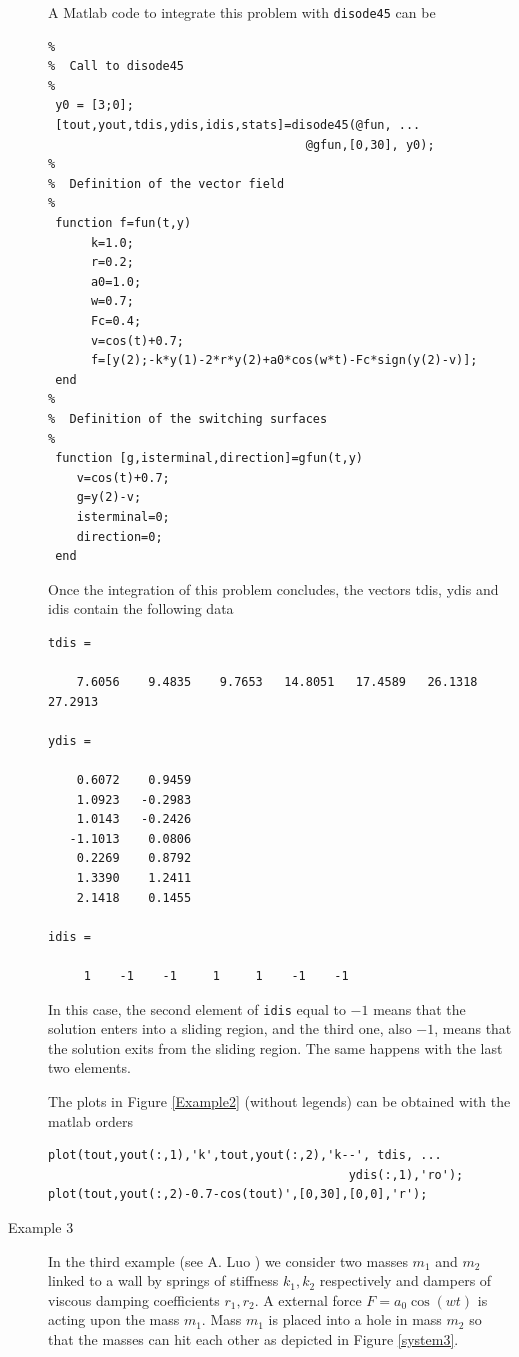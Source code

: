 \documentclass{article}
\begin{document}
\begin{description}
A Matlab code to integrate this problem with \texttt{disode45} can be

\bigskip

\begin{verbatim}
%
%  Call to disode45
%
 y0 = [3;0];
 [tout,yout,tdis,ydis,idis,stats]=disode45(@fun, ...
                                    @gfun,[0,30], y0);
%
%  Definition of the vector field
%
 function f=fun(t,y)
      k=1.0;
      r=0.2;
      a0=1.0;
      w=0.7;
      Fc=0.4;
      v=cos(t)+0.7;
      f=[y(2);-k*y(1)-2*r*y(2)+a0*cos(w*t)-Fc*sign(y(2)-v)];
 end
%
%  Definition of the switching surfaces
%
 function [g,isterminal,direction]=gfun(t,y)
    v=cos(t)+0.7;
    g=y(2)-v;
    isterminal=0;
    direction=0;
 end
\end{verbatim}

Once the integration of this problem concludes, the vectors tdis, ydis
and idis contain the following data

\begin{verbatim}
tdis =

    7.6056    9.4835    9.7653   14.8051   17.4589   26.1318   27.2913

ydis =

    0.6072    0.9459
    1.0923   -0.2983
    1.0143   -0.2426
   -1.1013    0.0806
    0.2269    0.8792
    1.3390    1.2411
    2.1418    0.1455

idis =

     1    -1    -1     1     1    -1    -1
\end{verbatim}

In this case, the second element of \texttt{idis} equal to $-1$ means that the solution
enters into a sliding region, and the third one, also $-1$, means that the solution
exits from the sliding region.  The same happens with the last two elements.

The plots in Figure \ref{Example2} (without legends) can be obtained with the matlab orders

\begin{verbatim}
plot(tout,yout(:,1),'k',tout,yout(:,2),'k--', tdis, ...
                                          ydis(:,1),'ro');
plot(tout,yout(:,2)-0.7-cos(tout)',[0,30],[0,0],'r');
\end{verbatim}


\item[Example 3]
In the third example (see A. Luo \cite[pp. 115]{Luo}) we consider two masses $m_1$ and $m_2$ linked to a
wall by springs of stiffness $k_1, k_2$ respectively
and dampers of viscous damping coefficients $r_1, r_2$. A external force $F=a_0 \cos(wt)$ is acting
upon the mass $m_1$.  Mass $m_1$ is placed into a hole in mass $m_2$ so that the masses
can hit each other as depicted in Figure \ref{system3}.


\end{description}
\end{document}
